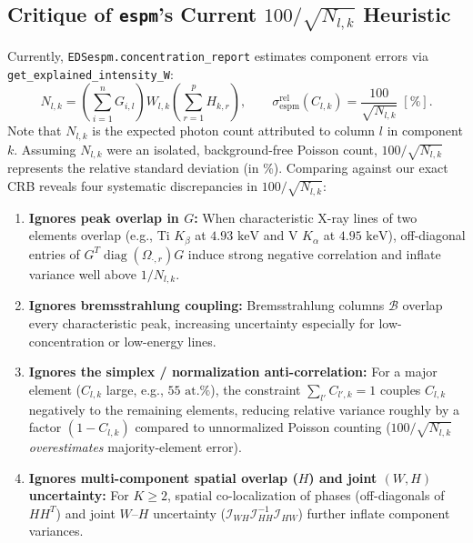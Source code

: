 \documentclass[11pt,a4paper]{article}
\theoremstyle{plain}
\theoremstyle{definition}
\theoremstyle{remark}
\newcommand{\B}{\mathcal{B}}
\newcommand{\cI}{\mathcal{I}}
\newcommand{\diag}{\operatorname{diag}}
\begin{document}
\subsection{Critique of \texttt{espm}'s Current \texorpdfstring{$100/\sqrt{N_{l,k}}$}{100/sqrt(N\_\{l,k\})} Heuristic}
Currently, \texttt{EDSespm.concentration\_report} estimates component errors via \texttt{get\_explained\_intensity\_W}:
\begin{equation}
N_{l,k} = \left(\sum_{i=1}^n G_{i,l}\right) W_{l,k} \left(\sum_{r=1}^p H_{k,r}\right), \qquad \sigma_{\text{espm}}^{\text{rel}}(C_{l,k}) = \frac{100}{\sqrt{N_{l,k}}} \; [\%].
\end{equation}
Note that $N_{l,k}$ is the expected photon count attributed to column $l$ in component $k$. Assuming $N_{l,k}$ were an isolated, background-free Poisson count, $100/\sqrt{N_{l,k}}$ represents the relative standard deviation (in \%). Comparing against our exact CRB reveals four systematic discrepancies in $100/\sqrt{N_{l,k}}$:
\begin{enumerate}[leftmargin=1.5em]
    \item \textbf{Ignores peak overlap in $G$:} When characteristic X-ray lines of two elements overlap (e.g., Ti $K_\beta$ at $4.93\text{ keV}$ and V $K_\alpha$ at $4.95\text{ keV}$), off-diagonal entries of $G^T \diag(\Omega_{\cdot,r}) G$ induce strong negative correlation and inflate variance well above $1/N_{l,k}$.
    \item \textbf{Ignores bremsstrahlung coupling:} Bremsstrahlung columns $\B$ overlap every characteristic peak, increasing uncertainty especially for low-concentration or low-energy lines.
    \item \textbf{Ignores the simplex / normalization anti-correlation:} For a major element ($C_{l,k}$ large, e.g., $55\text{ at.}\%$), the constraint $\sum_{l'} C_{l',k} = 1$ couples $C_{l,k}$ negatively to the remaining elements, reducing relative variance roughly by a factor $(1 - C_{l,k})$ compared to unnormalized Poisson counting ($100/\sqrt{N_{l,k}}$ \emph{overestimates} majority-element error).
    \item \textbf{Ignores multi-component spatial overlap ($H$) and joint $(W,H)$ uncertainty:} For $K \ge 2$, spatial co-localization of phases (off-diagonals of $H H^T$) and joint $W$--$H$ uncertainty ($\cI_{WH} \cI_{HH}^{-1} \cI_{HW}$) further inflate component variances.
\end{enumerate}

\end{document}
